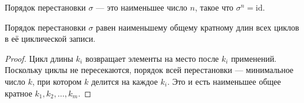 \begin{definition}
    Порядок перестановки $\sigma$ --- это наименьшее число $n$, такое что \(
        \sigma^n = \text{id}.
    \)
\end{definition}


\begin{theorem}
    Порядок перестановки $\sigma$ равен наименьшему общему кратному длин всех циклов в её циклической записи.
\end{theorem}
\begin{proof}
    Цикл длины $k_i$ возвращает элементы на место после $k_i$ применений. Поскольку циклы не пересекаются, порядок всей перестановки — минимальное число $k$, при котором $k$ делится на каждое $k_i$.  
    Это и есть наименьшее общее кратное $k_1, k_2, \dots, k_m$.
\end{proof}
